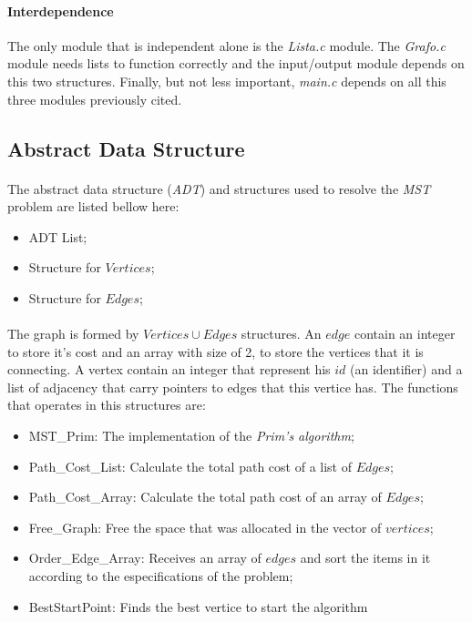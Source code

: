 \documentclass[titlepage]{article}
\begin{document}
        \paragraph{Interdependence}The only module that is independent alone is the \emph{Lista.c} module. The \emph{Grafo.c} module needs lists to function correctly and the input/output module depends on this two structures. Finally, but not less important, \emph{main.c} depends on all this three modules previously cited.
        \subsection{Abstract Data Structure}
        \paragraph{}
        The abstract data structure (\emph{ADT}) and structures used to resolve the \emph{MST} problem are listed bellow here:
        \begin{itemize}
            \item ADT List;
            \item Structure for $Vertices$;
            \item Structure for $Edges$;
        \end{itemize} 
        \paragraph{}
        The graph is formed by ${Vertices \cup Edges}$ structures. An $edge$ contain an integer to store it's cost and an array with size of 2, to store the vertices that it is connecting. A vertex contain an integer that represent his $id$ (an identifier) and a list of adjacency that carry pointers to edges that this vertice has. The functions that operates in this structures are:
        \begin{itemize}
            \item MST\_Prim: The implementation of the \emph{Prim's algorithm};
            \item Path\_Cost\_List: Calculate the total path cost of a list of $Edges$;
            \item Path\_Cost\_Array: Calculate the total path cost of an array of $Edges$;
            \item Free\_Graph: Free the space that was allocated in the vector of $vertices$;
            \item Order\_Edge\_Array: Receives an array of $edges$ and sort the items in it according to the especifications of the problem; 
            \item BestStartPoint: Finds the best vertice to start the algorithm
        \end{itemize}
\end{document}
